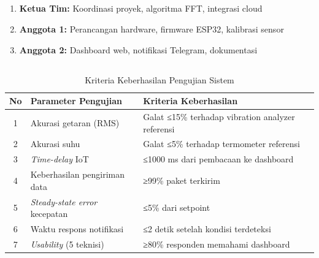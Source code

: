 \documentclass{elsinta}
\begin{document}
\subsection{\TeamDivisionTitle}

\begin{enumerate}
    \item \textbf{Ketua Tim:} Koordinasi proyek, algoritma FFT, integrasi cloud
    \item \textbf{Anggota 1:} Perancangan hardware, firmware ESP32, kalibrasi sensor
    \item \textbf{Anggota 2:} Dashboard web, notifikasi Telegram, dokumentasi
\end{enumerate}

\subsection{\SystemTestingTitle}

\begin{longtable}{|c|p{5cm}|p{7cm}|}
    \caption{Kriteria Keberhasilan Pengujian Sistem}
    \label{tab:pengujian} \\
    \hline
    \textbf{No} & \textbf{Parameter Pengujian} & \textbf{Kriteria Keberhasilan} \\
    \hline
    \endhead
    \hline
    1 & Akurasi getaran (RMS) & Galat ≤15\% terhadap vibration analyzer referensi \\
    \hline
    2 & Akurasi suhu & Galat ≤5\% terhadap termometer referensi \\
    \hline
    3 & \textit{Time-delay} IoT & ≤1000 ms dari pembacaan ke dashboard \\
    \hline
    4 & Keberhasilan pengiriman data & ≥99\% paket terkirim \\
    \hline
    5 & \textit{Steady-state error} kecepatan & ≤5\% dari setpoint \\
    \hline
    6 & Waktu respons notifikasi & ≤2 detik setelah kondisi terdeteksi \\
    \hline
    7 & \textit{Usability} (5 teknisi) & ≥80\% responden memahami dashboard \\
    \hline
\end{longtable}


\section{\RiskAssessmentTitle}
\end{document}
